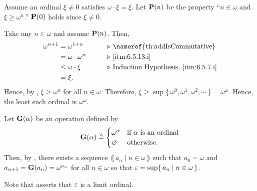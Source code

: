 \documentclass[../introduction_to_set_theory_Note.tex]{subfiles}
\begin{document}
{\begin{enumerate}[nolistsep, label=(\roman*), leftmargin=*, listparindent=\parindent]
    Assume an ordinal \(\xi \neq 0\) satisfies \(\omega \cdot \xi = \xi\).
    Let \(\bm{\mathrm{P}}(n)\) be the property ``\(n \in \omega\) and \(\xi \ge \omega^n\).''
    \(\bm{\mathrm{P}}(0)\) holds since \(\xi \neq 0\).

    Take any \(n \in \omega\) and assume \(\bm{\mathrm{P}}(n)\). Then,
    \begin{alignat*}{2}
        \omega^{n + 1}
        &= \omega^{1 + n} &\qquad& \comment*{\nameref{th:addIsCommutative}} \\
        &= \omega \cdot \omega^n && \comment*{\ref{itm:6.5.13.i}} \\
        &\le \omega \cdot \xi && \comment*{Induction Hypothesis, \ref{itm:6.5.7.i}} \\
        &= \xi.
    \end{alignat*}
    Hence, by , \(\xi \ge \omega^n\) for all \(n \in \omega\).
    Therefore, \(\xi \ge \sup \{\,\omega^0, \omega^1, \omega^2, \cdots\,\} = \omega^\omega\).
    Hence, the least such ordinal is \(\omega^\omega\).

    \ii
    Let \(\bm{\mathrm{G}}(\alpha)\) be an operation defined by
    \[
        \bm{\mathrm{G}}(\alpha) \triangleq \begin{cases}
            \omega^\alpha & \text{if }\alpha\text{ is an ordinal} \\
            \varnothing & \text{otherwise.}
        \end{cases}
    \]
    Then, by , there exists a sequence
    \(\lang\,a_n \mid n \in \omega\,\rang\) such that \(a_0 = \omega\)
    and \(a_{n+1} = \bm{\mathrm{G}}(a_n) = \omega^{a_n}\) for all \(n \in \omega\)
    so that \(\varepsilon = \sup \{\,a_n \mid n \in \omega\,\}\).

    \noindent
    Note that  asserts that \(\varepsilon\) is a limit ordinal.


\end{enumerate}}
\end{document}
